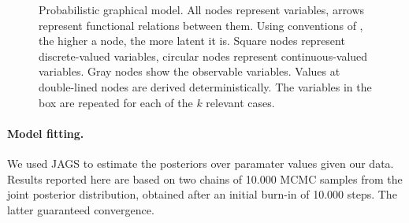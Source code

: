 \documentclass[fleqn,reqno,10pt]{article}
\begin{document}
\begin{figure}[]
  \caption{Probabilistic graphical model. All nodes represent
    variables, arrows represent functional relations between them.
    Using conventions of \citet{LeeWagenmakers2013:Bayesian-Cognit},
    the higher a node, the more latent it is. Square nodes represent
    discrete-valued variables, circular nodes represent
    continuous-valued variables. Gray nodes show the observable
    variables. Values at double-lined nodes are derived
    deterministically. The variables in the box are repeated for each
    of the $k$ relevant cases.}
  \label{fig:model_graph}
\end{figure}

\paragraph{Model fitting.} We used JAGS
\citep{Plummer2003:JAGS:-A-Program} to estimate the posteriors over
paramater values given our data. Results reported here are based on
two chains of 10.000 MCMC samples from the joint posterior
distribution, obtained after an initial burn-in of 10.000 steps. The
latter guaranteed convergence.
\end{document}
